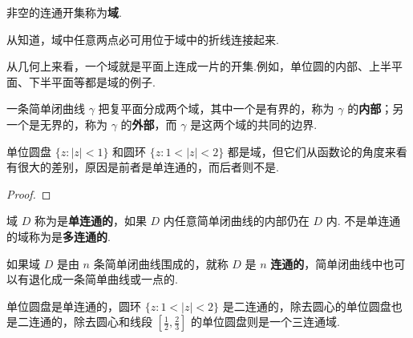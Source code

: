 \documentclass[../../main.tex]{subfiles}
\begin{document}
\begin{definition}
非空的连通开集称为\textbf{域}.
\end{definition}
\begin{note}
从知道，域中任意两点必可用位于域中的折线连接起来.

从几何上来看，一个域就是平面上连成一片的开集.例如，单位圆的内部、上半平面、下半平面等都是域的例子.
\end{note}

\begin{theorem}[Jordan定理]\label{theorem:Jordan定理}
一条简单闭曲线 $\gamma$ 把复平面分成两个域，其中一个是有界的，称为 $\gamma$ 的\textbf{内部}；另一个是无界的，称为 $\gamma$ 的\textbf{外部}，而 $\gamma$ 是这两个域的共同的边界.
\end{theorem}
\begin{note}
单位圆盘 $\{ z: \vert z \vert < 1\}$ 和圆环 $\{ z: 1 < \vert z \vert < 2\}$ 都是域，但它们从函数论的角度来看有很大的差别，原因是前者是单连通的，而后者则不是.
\end{note}
\begin{proof}

\end{proof}


\begin{definition}
域 $D$ 称为是\textbf{单连通的}，如果 $D$ 内任意简单闭曲线的内部仍在 $D$ 内. 不是单连通的域称为是\textbf{多连通的}.
\end{definition}

\begin{definition}
如果域 $D$ 是由 $n$ 条简单闭曲线围成的，就称 $D$ 是 $n$ \textbf{连通的}，简单闭曲线中也可以有退化成一条简单曲线或一点的.
\end{definition}

\begin{example}
单位圆盘是单连通的，圆环 $\{ z: 1 < \vert z \vert < 2\}$ 是二连通的，除去圆心的单位圆盘也是二连通的，除去圆心和线段 $\left[ \frac{1}{2}, \frac{2}{3} \right]$ 的单位圆盘则是一个三连通域.
\end{example}
\end{document}
